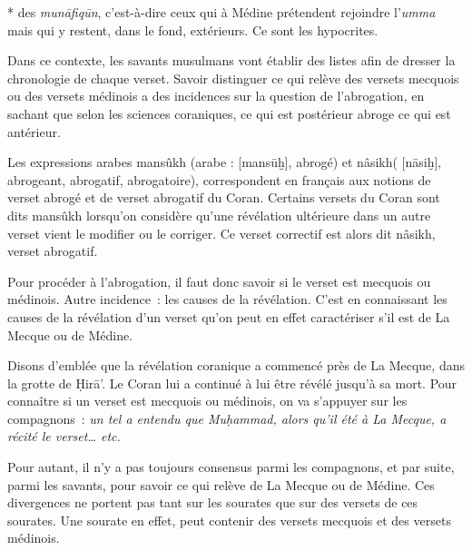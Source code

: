 * des \emph{munāfiqūn}, c'est-à-dire ceux qui à Médine prétendent
rejoindre l'\emph{umma} mais qui y restent, dans le fond, extérieurs. Ce
sont les hypocrites.

Dans ce contexte, les savants musulmans vont établir des listes afin de
dresser la chronologie de chaque verset. Savoir distinguer ce qui relève
des versets mecquois ou des versets médinois a des incidences sur la
question de l'abrogation, en sachant que selon les sciences coraniques,
ce qui est postérieur abroge ce qui est antérieur.
\begin{Def}
\label{mansûkh}
Les expressions arabes mansûkh (arabe :
[mansūḫ], abrogé) et nâsikh( 
[nāsiḫ], abrogeant, abrogatif, abrogatoire), correspondent en français aux notions de verset abrogé et de verset abrogatif du Coran. Certains versets du Coran sont dits mansûkh lorsqu'on considère qu'une révélation ultérieure dans un autre verset vient le modifier ou le corriger. Ce verset correctif est alors dit nâsikh, verset abrogatif.
\end{Def}
Pour procéder à
l'abrogation, il faut donc savoir si le verset est mecquois ou médinois.
Autre incidence~: les causes de la révélation. C'est en connaissant les
causes de la révélation d'un verset qu'on peut en effet caractériser
s'il est de La Mecque ou de Médine.



Disons d'emblée que la révélation coranique a commencé près de La
Mecque, dans la grotte de Ḥirā'. Le Coran lui a continué à lui être
révélé jusqu'à sa mort. Pour connaître si un verset est mecquois ou
médinois, on va s'appuyer sur les compagnons~: \emph{un tel a entendu
que Muḥammad, alors qu'il été à La Mecque, a récité le verset\ldots{}
etc.}

Pour autant, il n'y a pas toujours consensus parmi les compagnons, et
par suite, parmi les savants, pour savoir ce qui relève de La Mecque ou
de Médine. Ces divergences ne portent pas tant sur les sourates que sur
des versets de ces sourates. Une sourate en effet, peut contenir des
versets mecquois et des versets médinois.

